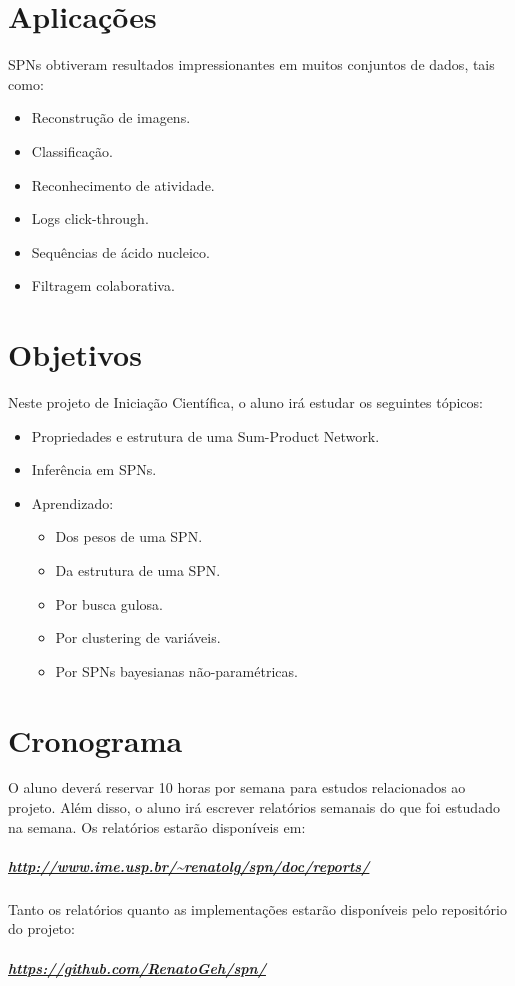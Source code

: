 \documentclass[a4paper,10pt]{article}
\theoremstyle{plain}
\begin{document}
\section{Aplicações}

SPNs obtiveram resultados impressionantes em muitos conjuntos de dados\cite{website:spn-uwashington}, tais como:

\begin{itemize} \itemsep0pt
  \item Reconstrução de imagens.
  \item Classificação.
  \item Reconhecimento de atividade.
  \item Logs click-through.
  \item Sequências de ácido nucleico.
  \item Filtragem colaborativa.
\end{itemize}


\section{Objetivos}

Neste projeto de Iniciação Científica, o aluno irá estudar os seguintes tópicos:

\begin{itemize}
  \item Propriedades e estrutura de uma Sum-Product Network.
  \item Inferência em SPNs.
  \item Aprendizado:
  \begin{itemize}
    \item Dos pesos de uma SPN.\cite{poon-domingos}
    \item Da estrutura de uma SPN.\cite{gens-domingos}
    \item Por busca gulosa.\cite{greedy-search}
    \item Por clustering de variáveis.\cite{clustering}
    \item Por SPNs bayesianas não-paramétricas.\cite{non-parametric-bayesian}
  \end{itemize}
\end{itemize}

\section{Cronograma}

O aluno deverá reservar 10 horas por semana para estudos relacionados ao projeto. Além disso, o
aluno irá escrever relatórios semanais do que foi estudado na semana. Os relatórios estarão 
disponíveis em:

\subparagraph{\url{http://www.ime.usp.br/~renatolg/spn/doc/reports/}}

Tanto os relatórios quanto as implementações estarão disponíveis pelo repositório do projeto:

\subparagraph{\url{https://github.com/RenatoGeh/spn/}}

\newpage

\printbibliography
\end{document}
